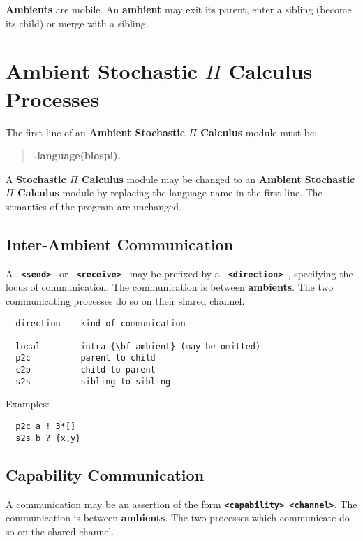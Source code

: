 \documentclass[twoside,10pt]{report}
\begin{document}
{\bf Ambients} are mobile. An {\bf ambient} may
exit its parent, enter a sibling (become its child) or merge with a
sibling.

\section{Ambient Stochastic $\Pi$ Calculus Processes}

The first line of an {\bf Ambient Stochastic $\Pi$ Calculus} module must be:

\begin{verse}
 {\bfseries
   -language(biospi).
 }
\end{verse}

\noindent
A {\bf Stochastic $\Pi$ Calculus} module may be changed to an
{\bf Ambient Stochastic $\Pi$ Calculus} module by
replacing the language name in the first line.  The semantics
of the program are unchanged.

\subsection{Inter-Ambient Communication}

A {\bf \verb+ <send> +} or {\bf \verb+ <receive> +} may be prefixed by a
{\bf \verb+ <direction> +}, specifying the locus of communication.
The communication is between {\bf ambients}.  The two communicating
processes do so on their shared channel.

\begin{verbatim}
  direction    kind of communication

  local        intra-{\bf ambient} (may be omitted)
  p2c          parent to child
  c2p          child to parent
  s2s          sibling to sibling
\end{verbatim}

\noindent
Examples:

\begin{verbatim}
  p2c a ! 3*[]
  s2s b ? {x,y}
\end{verbatim}

\subsection{Capability Communication}

A communication may be an assertion of the form
{\bf \verb+<capability> <channel>+}.
The communication is between {\bf ambients}.  The two
processes which communicate do so on the shared channel.
\end{document}
